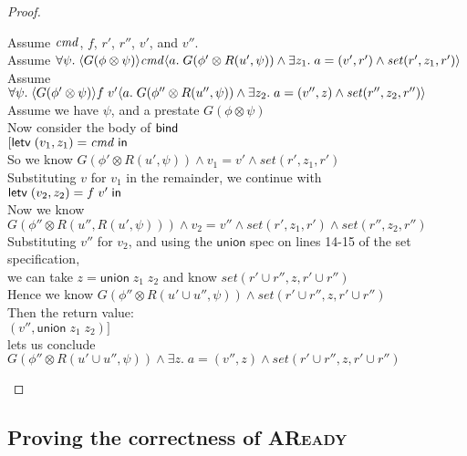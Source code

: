 \begin{proof}
\begin{tabbedproof}
\oo Assume $\mathit{cmd}$, $f$, $r'$, $r''$, $v'$, and $v''$. \\
\oo Assume $\forall \psi.\; \langle{G(\phi \otimes \psi)}\rangle{\mathit{cmd}}\langle{a}.\;{G(\phi' \otimes R(u', \psi)) \land \exists z_1.\;a = (v', r') \land \mathit{set}(r', z_1, r')}\rangle$ \\
\oo Assume $\forall \psi.\; \langle{G(\phi' \otimes \psi)}\rangle{f\;v'}\langle{a}.\;{G(\phi'' \otimes R(u'', \psi)) \land \exists z_2.\; a = (v'', z) \land \mathit{set}(r'', z_2, r'')}\rangle$ \\
\oo Assume we have $\psi$, and a prestate $G(\phi \otimes \psi)$ \\
\ooo Now consider the body of $\mathsf{bind}\;$ \\
\ooo $[\mathsf{letv}\;(v_1, z_1) = \mathit{cmd}\;\mathsf{in}\;$ \\
\ooo So we know $G(\phi' \otimes R(u', \psi)) \land v_1 = v' \land \mathit{set}(r', z_1, r')$ \\
\ooo Substituting $v$ for $v_1$ in the remainder, we continue with \\
\ooo $\mathsf{letv}\;(v_2, z_2) = f\;v'\;\mathsf{in}\;$ \\
\ooo Now we know $G(\phi'' \otimes R(u'', R(u', \psi))) \land v_2 = v'' \land \mathit{set}(r', z_1, r') \land \mathit{set}(r'', z_2, r'')$ \\
\ooo Substituting $v''$ for $v_2$, and using the $\textsf{union}$ spec on lines 14-15 of the set specification, \\
\ooo we can take $z = \mathsf{union}\;z_1\;z_2$ and know $\mathit{set}(r' \cup r'', z, r' \cup r'')$ \\
\ooo Hence we know $G(\phi'' \otimes R(u' \cup u'', \psi)) \land \mathit{set}(r' \cup r'', z, r' \cup r'')$ \\
\ooo Then the return value: \\
\ooo $(v'', \mathsf{union}\;z_1\;z_2)]$ \\
\ooo lets us conclude $G(\phi'' \otimes R(u' \cup u'', \psi)) \land \exists z.\; a = (v'', z) \land \mathit{set}(r' \cup r'', z, r' \cup r'')$ 
\end{tabbedproof}
\end{proof}

\subsection{Proving the correctness of \textsc{AReady}}

